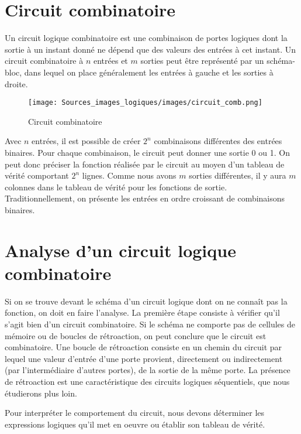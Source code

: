 \documentclass[letter, oneside]{book}
\begin{document}
\section{Circuit combinatoire}
\label{sec:org4f36388}

Un circuit logique combinatoire est une combinaison de portes logiques
dont la sortie à un instant donné ne dépend que des valeurs des
entrées à cet instant. Un circuit combinatoire à \(n\) entrées et
\(m\) sorties peut être représenté par un schéma-bloc, dans lequel on
place généralement les entrées à gauche et les sorties à droite.

\begin{figure}[htbp]
\centering
\texttt{[image: Sources\_images\_logiques/images/circuit\_comb.png]}
\caption{\label{fig:orgcab55bf}Circuit combinatoire}
\end{figure}

Avec \(n\) entrées, il est possible de créer \(2^n\) combinaisons
différentes des entrées binaires. Pour chaque combinaison, le circuit
peut donner une sortie 0 ou 1. On peut donc préciser la fonction
réalisée par le circuit au moyen d'un tableau de vérité comportant \(2^n\)
lignes. Comme nous avons \(m\) sorties différentes, il y aura \(m\)
colonnes dans le tableau de vérité pour les fonctions de
sortie. Traditionnellement, on présente les entrées en ordre croissant
de combinaisons binaires.

\section{Analyse d'un circuit logique combinatoire}
\label{sec:org0bc9ea6}

Si on se trouve devant le schéma d'un circuit logique dont on ne
connaît pas la fonction, on doit en faire l'analyse. La première étape
consiste à vérifier qu'il s'agit bien d'un circuit combinatoire. Si le
schéma ne comporte pas de cellules de mémoire ou de boucles de
rétroaction, on peut conclure que le circuit est combinatoire. Une
boucle de rétroaction consiste en un chemin du circuit par
lequel une valeur d'entrée d'une porte provient, directement ou
indirectement (par l'intermédiaire d'autres portes), de la sortie de
la même porte. La présence de rétroaction est une caractéristique des
circuits logiques séquentiels, que nous étudierons plus loin.

Pour interpréter le comportement du circuit, nous devons déterminer
les expressions logiques qu'il met en oeuvre ou établir son tableau de
vérité.
\end{document}
